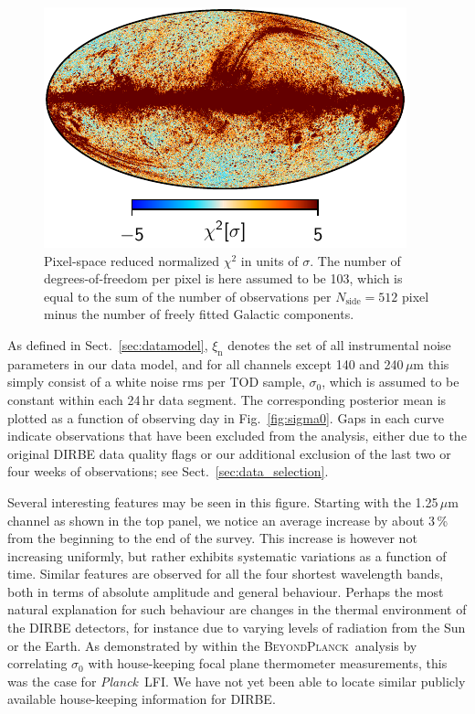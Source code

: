 \documentclass{aa}
\def\Planck{\textit{Planck}}
\newcommand{\BP}{\textsc{BeyondPlanck}}
\begin{document}
       \begin{figure}
       	\centering
       	\includegraphics[width=\linewidth]{figs/chisq_CG02_c1_v2.pdf}
       	\caption{Pixel-space reduced normalized $\chi^2$ in units of $\sigma$. The number of degrees-of-freedom per pixel is here assumed to be 103, which is equal to the sum of the number of observations per $N_{\mathrm{side}}=512$ pixel minus the number of freely fitted Galactic components. }
       	\label{fig:chisq}
       \end{figure}



As defined in Sect.~\ref{sec:datamodel}, $\xi_{\mathrm{n}}$ denotes
the set of all instrumental noise parameters in our data model, and
for all channels except 140 and 240$\,\mu$m this simply consist of a white
noise rms per TOD sample, $\sigma_0$, which is assumed to be constant
within each 24\,hr data segment. The corresponding posterior mean is
plotted as a function of observing day in Fig.~\ref{fig:sigma0}. Gaps
in each curve indicate observations that have been excluded from the
analysis, either due to the original DIRBE data quality flags or our
additional exclusion of the last two or four weeks of observations;
see Sect.~\ref{sec:data_selection}.

Several interesting features may be seen in this figure. Starting with
the 1.25$\,\mu$m channel as shown in the top panel, we notice an
average increase by about 3\,\% from the beginning to the end of the
survey. This increase is however not increasing uniformly, but rather
exhibits systematic variations as a function of time. Similar features
are observed for all the four shortest wavelength bands, both in terms
of absolute amplitude and general behaviour. Perhaps the most natural
explanation for such behaviour are changes in the thermal environment
of the DIRBE detectors, for instance due to varying levels of
radiation from the Sun or the Earth. As demonstrated by \citet{bp06}
within the \BP\ analysis by correlating $\sigma_0$ with house-keeping
focal plane thermometer measurements, this was the case for
\Planck\ LFI. We have not yet been able to locate
similar publicly available house-keeping information for DIRBE.
\end{document}
